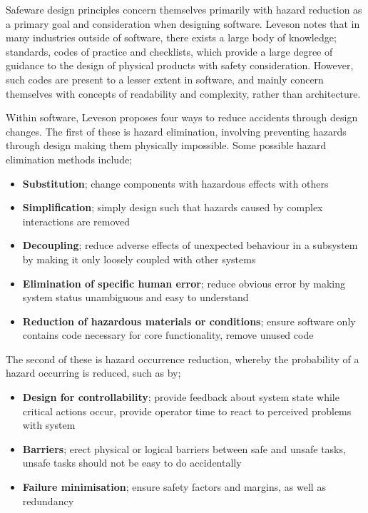 \documentclass{cshonours}
\begin{document}
Safeware design principles concern themselves primarily with hazard reduction as a primary goal and consideration when designing software. Leveson notes that in many industries outside of software, there exists a large body of knowledge; standards, codes of practice and checklists, which provide a large degree of guidance to the design of physical products with safety consideration. However, such codes are present to a lesser extent in software, and mainly concern themselves with concepts of readability and complexity, rather than architecture.

Within software, Leveson proposes four ways to reduce accidents through design changes. The first of these is hazard elimination, involving preventing hazards through design making them physically impossible. Some possible hazard elimination methods include;
 \begin{itemize}
  \item \textbf{Substitution}; change components with hazardous effects with others
  \item \textbf{Simplification}; simply design such that hazards caused by complex interactions are removed
  \item \textbf{Decoupling}; reduce adverse effects of unexpected behaviour in a subsystem by making it only loosely coupled with other systems
  \item \textbf{Elimination of specific human error}; reduce obvious error by making system status unambiguous and easy to understand
  \item \textbf{Reduction of hazardous materials or conditions}; ensure software only contains code necessary for core functionality, remove unused code
 \end{itemize}
 
The second of these is hazard occurrence reduction, whereby the probability of a hazard occurring is reduced, such as by;
 \begin{itemize}
  \item \textbf{Design for controllability}; provide feedback about system state while critical actions occur, provide operator time to react to perceived problems with system
  \item \textbf{Barriers}; erect physical or logical barriers between safe and unsafe tasks, unsafe tasks should not be easy to do accidentally
  \item \textbf{Failure minimisation}; ensure safety factors and margins, as well as redundancy
 \end{itemize}
 
\end{document}
